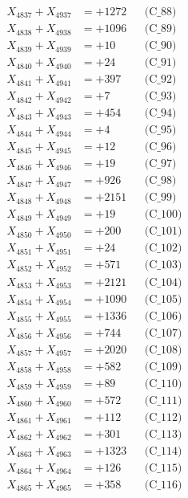 \documentclass[a4paper,10pt]{article}
\begin{document}
{\begin{align}
X_{4837} + X_{4937} &= +1272 && \text{(C\_88)} \\
X_{4838} + X_{4938} &= +1096 && \text{(C\_89)} \\
X_{4839} + X_{4939} &= +10 && \text{(C\_90)} \\
\allowbreak
X_{4840} + X_{4940} &= +24 && \text{(C\_91)} \\
X_{4841} + X_{4941} &= +397 && \text{(C\_92)} \\
X_{4842} + X_{4942} &= +7 && \text{(C\_93)} \\
X_{4843} + X_{4943} &= +454 && \text{(C\_94)} \\
X_{4844} + X_{4944} &= +4 && \text{(C\_95)} \\
\allowbreak
X_{4845} + X_{4945} &= +12 && \text{(C\_96)} \\
X_{4846} + X_{4946} &= +19 && \text{(C\_97)} \\
X_{4847} + X_{4947} &= +926 && \text{(C\_98)} \\
X_{4848} + X_{4948} &= +2151 && \text{(C\_99)} \\
X_{4849} + X_{4949} &= +19 && \text{(C\_100)} \\
\allowbreak
X_{4850} + X_{4950} &= +200 && \text{(C\_101)} \\
X_{4851} + X_{4951} &= +24 && \text{(C\_102)} \\
X_{4852} + X_{4952} &= +571 && \text{(C\_103)} \\
X_{4853} + X_{4953} &= +2121 && \text{(C\_104)} \\
X_{4854} + X_{4954} &= +1090 && \text{(C\_105)} \\
\allowbreak
X_{4855} + X_{4955} &= +1336 && \text{(C\_106)} \\
X_{4856} + X_{4956} &= +744 && \text{(C\_107)} \\
X_{4857} + X_{4957} &= +2020 && \text{(C\_108)} \\
X_{4858} + X_{4958} &= +582 && \text{(C\_109)} \\
X_{4859} + X_{4959} &= +89 && \text{(C\_110)} \\
\allowbreak
X_{4860} + X_{4960} &= +572 && \text{(C\_111)} \\
X_{4861} + X_{4961} &= +112 && \text{(C\_112)} \\
X_{4862} + X_{4962} &= +301 && \text{(C\_113)} \\
X_{4863} + X_{4963} &= +1323 && \text{(C\_114)} \\
X_{4864} + X_{4964} &= +126 && \text{(C\_115)} \\
\allowbreak
X_{4865} + X_{4965} &= +358 && \text{(C\_116)} \\

\end{align}}
\end{document}
